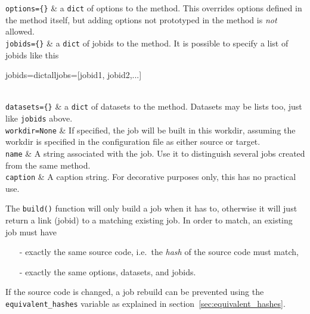 \RPtwo \texttt{options=\{\}} & a \texttt{dict} of options to the method.
    This overrides options defined in the method itself, but adding
    options not prototyped in the method is \textsl{not} allowed.\\[2ex]

\RPtwo \texttt{jobids=\{\}} & a \texttt{dict} of jobids to the method.
    It is possible to specify a list of jobids like this
\begin{python}
jobids=dict{alljobs=[jobid1, jobid2,...]}
\end{python}
\\[0ex]

\RPtwo \texttt{datasets=\{\}} & a \texttt{dict} of datasets to the method.
    Datasets may be lists too, just like \texttt{jobids} above.\\[2ex]

\RPtwo \texttt{workdir=None} & If specified, the job will be built in
    this workdir, assuming the workdir is specified in the
    configuration file as either source or target.\\[2ex]

\RPtwo \texttt{name} & A string associated with the job.  Use it
    to distinguish several jobs created from the same method.\\[2ex]
    \texttt{caption} & A caption string.  For decorative purposes
    only, this has no practical use.
\stoptabletwo

The \texttt{build()} function will only build a job when it has to,
otherwise it will just return a link (jobid) to a matching existing
job.  In order to match, an existing job must have
\begin{itemize}
\item[-] exactly the same source code, i.e.\ the \textsl{hash} of the source code must match,
\item[-] exactly the same options, datasets, and jobids.
\end{itemize}
If the source code is changed, a job rebuild can be prevented using
the \texttt{equivalent\_hashes} variable as explained in
section~\ref{sec:equivalent_hashes}.



